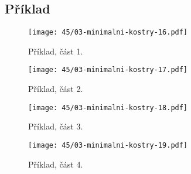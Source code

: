 \subsection{Příklad}

\begin{figure}[H]
    \centering
    \texttt{[image: 45/03-minimalni-kostry-16.pdf]}
    \caption{Příklad, část 1.}
\end{figure}

\begin{figure}[H]
    \centering
    \texttt{[image: 45/03-minimalni-kostry-17.pdf]}
    \caption{Příklad, část 2.}
\end{figure}

\begin{figure}[H]
    \centering
    \texttt{[image: 45/03-minimalni-kostry-18.pdf]}
    \caption{Příklad, část 3.}
\end{figure}

\begin{figure}[H]
    \centering
    \texttt{[image: 45/03-minimalni-kostry-19.pdf]}
    \caption{Příklad, část 4.}
\end{figure}
